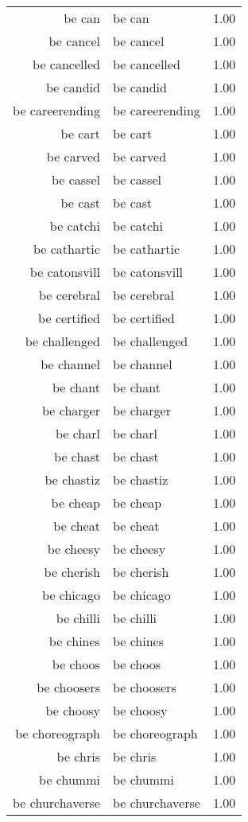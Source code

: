\begin{table}[ht]
\begin{tabular}{rlr}
  be can & be can & 1.00 \\ 
  be cancel & be cancel & 1.00 \\ 
  be cancelled & be cancelled & 1.00 \\ 
  be candid & be candid & 1.00 \\ 
  be careerending & be careerending & 1.00 \\ 
  be cart & be cart & 1.00 \\ 
  be carved & be carved & 1.00 \\ 
  be cassel & be cassel & 1.00 \\ 
  be cast & be cast & 1.00 \\ 
  be catchi & be catchi & 1.00 \\ 
  be cathartic & be cathartic & 1.00 \\ 
  be catonsvill & be catonsvill & 1.00 \\ 
  be cerebral & be cerebral & 1.00 \\ 
  be certified & be certified & 1.00 \\ 
  be challenged & be challenged & 1.00 \\ 
  be channel & be channel & 1.00 \\ 
  be chant & be chant & 1.00 \\ 
  be charger & be charger & 1.00 \\ 
  be charl & be charl & 1.00 \\ 
  be chast & be chast & 1.00 \\ 
  be chastiz & be chastiz & 1.00 \\ 
  be cheap & be cheap & 1.00 \\ 
  be cheat & be cheat & 1.00 \\ 
  be cheesy & be cheesy & 1.00 \\ 
  be cherish & be cherish & 1.00 \\ 
  be chicago & be chicago & 1.00 \\ 
  be chilli & be chilli & 1.00 \\ 
  be chines & be chines & 1.00 \\ 
  be choos & be choos & 1.00 \\ 
  be choosers & be choosers & 1.00 \\ 
  be choosy & be choosy & 1.00 \\ 
  be choreograph & be choreograph & 1.00 \\ 
  be chris & be chris & 1.00 \\ 
  be chummi & be chummi & 1.00 \\ 
  be churchaverse & be churchaverse & 1.00 \\ 

\end{tabular}
\end{table}
